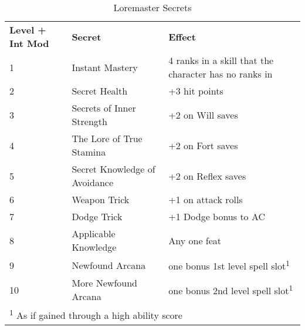 \begin{table}[htb]
\mcinherit
\caption{Loremaster Secrets}
\centering
\begin{tabular}{l l l}
\textbf{Level + Int Mod} & \textbf{Secret} & \textbf{Effect} \\
1 & Instant Mastery & 4 ranks in a skill that the character has no ranks in\\
2 & Secret Health & +3 hit points\\
3 & Secrets of Inner Strength & +2 on Will saves\\
4 & The Lore of True Stamina & +2 on Fort saves\\
5 & Secret Knowledge of Avoidance & +2 on Reflex saves\\
6 & Weapon Trick & +1 on attack rolls\\
7 & Dodge Trick & +1 Dodge bonus to AC\\
8 & Applicable Knowledge & Any one feat\\
9 & Newfound Arcana & one bonus 1st level spell slot\textsuperscript{1}\\
10 & More Newfound Arcana & one bonus 2nd level spell slot\textsuperscript{1}\\
\multicolumn{3}{l}{\textsuperscript{1} As if gained through a high ability score}\\
\end{tabular}
\end{table}
